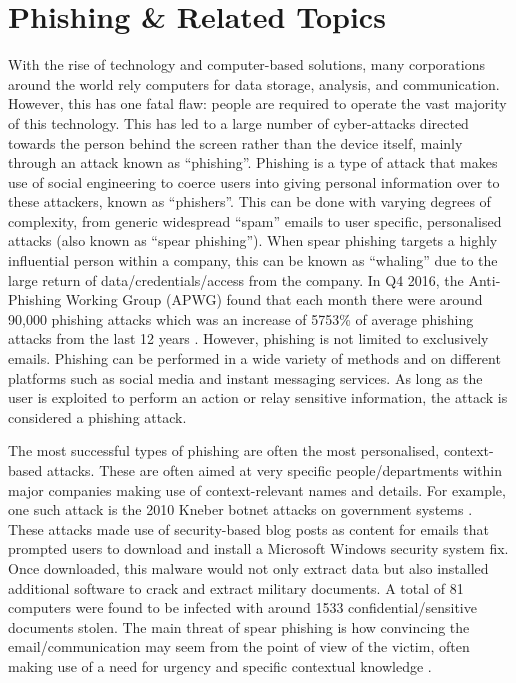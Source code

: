 \documentclass{l4proj}
\begin{document}
\section{Phishing & Related Topics}
With the rise of technology and computer-based solutions, many corporations around the world rely computers for data storage, analysis, and communication. However, this has one fatal flaw: people are required to operate the vast majority of this technology. This has led to a large number of cyber-attacks directed towards the person behind the screen rather than the device itself, mainly through an attack known as “phishing”.
Phishing is a type of attack that makes use of social engineering to coerce users into giving personal information over to these attackers, known as “phishers”. This can be done with varying degrees of complexity, from generic widespread “spam” emails to user specific, personalised attacks (also known as “spear phishing”). When spear phishing targets a highly influential person within a company, this can be known as “whaling” due to the large return of data/credentials/access from the company. In Q4 2016, the Anti-Phishing Working Group (APWG) found that each month there were around 90,000 phishing attacks which was an increase of 5753\% of average phishing attacks from the last 12 years \citep{aarsten1996patterns}. However, phishing is not limited to exclusively emails. Phishing can be performed in a wide variety of methods and on different platforms such as social media and instant messaging services. As long as the user is exploited to perform an action or relay sensitive information, the attack is considered a phishing attack.
\newline

The most successful types of phishing are often the most personalised, context-based attacks. These are often aimed at very specific people/departments within major companies making use of context-relevant names and details. For example, one such attack is the 2010 Kneber botnet attacks on government systems \citep{villeneuve2010kneber}. These attacks made use of security-based blog posts as content for emails that prompted users to download and install a Microsoft Windows security system fix. Once downloaded, this malware would not only extract data but also installed additional software to crack and extract military documents. A total of 81 computers were found to be infected with around 1533 confidential/sensitive documents stolen. The main threat of spear phishing is how convincing the email/communication may seem from the point of view of the victim, often making use of a need for urgency and specific contextual knowledge \citep{nicho2018evaluating}.
\newline
\end{document}
